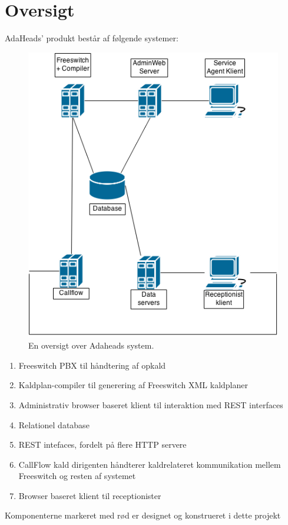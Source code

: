 \section{Oversigt}
AdaHeads' produkt består af følgende systemer:
\begin{figure}[ht!]
\centering
\includegraphics[scale=0.5]{images/adaheads_system.png}
\caption{En oversigt over Adaheads system.}
\label{fig:adaheadssystem}
\end{figure}
\begin{enumerate}
	\item{Freeswitch PBX til håndtering af opkald} 
	\item{Kaldplan-compiler til generering af Freeswitch XML kaldplaner}
	\item{Administrativ browser baseret klient til interaktion med REST interfaces}
	\item{Relationel database}
	\item{REST intefaces, fordelt på flere HTTP servere}
	\item{CallFlow kald dirigenten håndterer kaldrelateret kommunikation mellem Freeswitch og resten af systemet}
	\item{Browser baseret klient til receptionister}
\end{enumerate}
Komponenterne markeret med rød er designet og konstrueret i dette projekt


